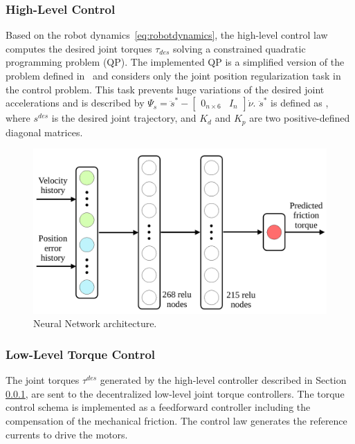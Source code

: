 \subsubsection{High-Level Control}
\label{sec:HLC}
Based on the robot dynamics~\eqref{eq:robotdynamics}, the high-level control law computes the desired joint torques $\tau_{des}$ solving a constrained quadratic programming problem (QP). The implemented QP is a simplified version of the problem defined in~\cite{romualdi2022whole} and considers only the joint position regularization task in the control problem.
This task prevents huge variations of the desired joint accelerations and is described by \mbox{$\Psi_{s} = \ddot{s}^{*} - \begin{bmatrix} 0_{n \times 6}  & I_{n}  \end{bmatrix} \dot{\nu}$}. $\ddot{s}^{*}$ is defined as , where $s^{des}$ is the desired joint trajectory, and $K_d$ and $K_p$ are two positive-defined diagonal matrices.

\begin{figure}[t]
    \centering
    \includegraphics[width=0.85\linewidth]{figures/PINN.pdf}
    \caption{Neural Network architecture.}
    \label{fig:nnarchitecture}
    \vspace{-20pt}
\end{figure}

\subsubsection{Low-Level Torque Control}
The joint torques $\tau^{des}$ generated by the high-level controller described in Section \ref{sec:HLC}, are sent to the decentralized low-level joint torque controllers. The torque control schema is implemented as a feedforward controller including the compensation of the mechanical friction. The control law generates the reference currents to drive the motors.
